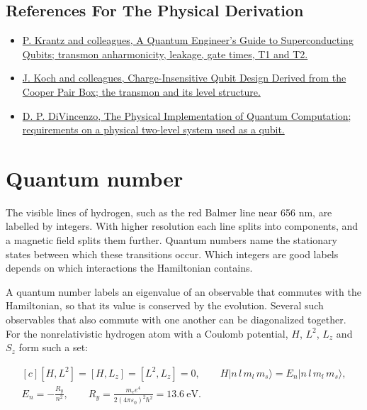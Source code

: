 \documentclass[11pt,oneside]{book}
\newenvironment{centeredalign}{\[\begin{gathered}[c]}{\end{gathered}\]}
\newcommand{\ket}[1]{\lvert #1\rangle}
\begin{document}
\subsection*{References For The Physical Derivation}
\begin{itemize}
\item \href{https://arxiv.org/abs/1904.06560}{P. Krantz and colleagues, A Quantum Engineer's Guide to Superconducting Qubits; transmon anharmonicity, leakage, gate times, T1 and T2.}
\item \href{https://arxiv.org/abs/cond-mat/0703002}{J. Koch and colleagues, Charge-Insensitive Qubit Design Derived from the Cooper Pair Box; the transmon and its level structure.}
\item \href{https://arxiv.org/abs/quant-ph/0002077}{D. P. DiVincenzo, The Physical Implementation of Quantum Computation; requirements on a physical two-level system used as a qubit.}
\end{itemize}





\clearpage

\section{Quantum number}

\label{topic:quantum-number}

The visible lines of hydrogen, such as the red Balmer line near 656 nm, are labelled by integers. With higher resolution each line splits into components, and a magnetic field splits them further. Quantum numbers name the stationary states between which these transitions occur. Which integers are good labels depends on which interactions the Hamiltonian contains.

A quantum number labels an eigenvalue of an observable that commutes with the Hamiltonian, so that its value is conserved by the evolution. Several such observables that also commute with one another can be diagonalized together. For the nonrelativistic hydrogen atom with a Coulomb potential, \(H\), \(L^2\), \(L_z\) and \(S_z\) form such a set:

\begin{centeredalign}
[H,L^2]=[H,L_z]=[L^2,L_z]=0,\qquad H\ket{n\,l\,m_l\,m_s}=E_n\ket{n\,l\,m_l\,m_s},\\
E_n=-\frac{R_y}{n^2},\qquad R_y=\frac{m_ee^4}{2(4\pi\varepsilon_0)^2\hbar^2}=13.6\ \mathrm{eV}.
\end{centeredalign}
\end{document}
